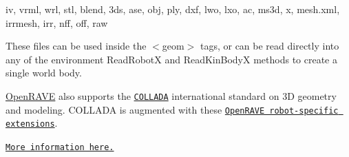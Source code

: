 \begin{DoxyItemize}
\item iv, vrml, wrl, stl, blend, 3ds, ase, obj, ply, dxf, lwo, lxo, ac, ms3d, x, mesh.xml, irrmesh, irr, nff, off, raw
\end{DoxyItemize}

These files can be used inside the $<$geom$>$ tags, or can be read directly into any of the environment ReadRobotX and ReadKinBodyX methods to create a single world body.

\hyperlink{namespaceOpenRAVE}{OpenRAVE} also supports the \href{http://www.collada.org}{\tt COLLADA} international standard on 3D geometry and modeling. COLLADA is augmented with these \href{http://openrave.programmingvision.com/wiki/index.php/Format:COLLADA}{\tt OpenRAVE robot-\/specific extensions}.

\href{../main/robots_overview.html#file-formats}{\tt More information here.} 
